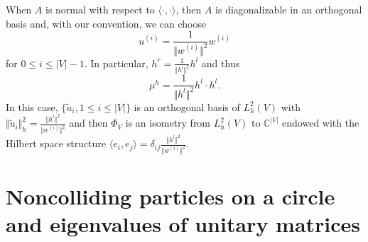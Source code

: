 \documentclass[10pt,11pt]{amsart}%
\begin{document}
When $A$ is normal with respect to $\langle \cdot,\cdot\rangle$, then $A$ is diagonalizable in an orthogonal basis and, with our convention, we can choose 
\begin{equation}\label{eq:normal_adjacency}
u^{(i)}=\frac{1}{\Vert w^{(i)}\Vert^2}w^{(i)}
\end{equation}
for $0\leq i\leq |V|-1$. In particular, $h^r=\frac{1}{\Vert h^l\Vert^2}h^l$ and thus 
$$\mu^h=\frac{1}{\Vert h^l\Vert^2}h^l\cdot h^l.$$
In this case, $\lbrace \tilde{u}_i, 1\leq i\leq \vert V\vert\rbrace$ is an orthogonal basis of $L^2_h(V)$ with $\Vert \tilde{u}_i\Vert_{h}^2=\frac{\Vert h^l\Vert^2}{\Vert w^{(i)}\Vert^2}$ and then $\Phi_V$ is an isometry from $L^2_h(V)$ to $\mathbb{C}^{\vert V\vert}$ endowed with the Hilbert space structure $\langle e_i,e_j\rangle=\delta_{ij}\frac{\Vert h^l\Vert^2}{\Vert w^{(i)}\Vert^2}$.


\section{Noncolliding particles on a circle and eigenvalues of unitary matrices}\label{sec:formal_model_pm}
\end{document}
